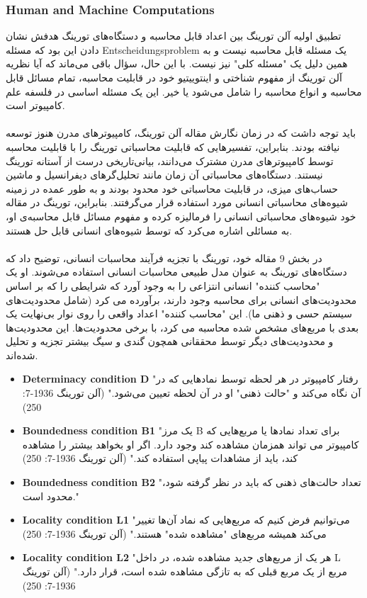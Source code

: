 \documentclass[10pt,a4paper]{article}
\begin{document}
                \subsubsection{Human and Machine Computations}
تطبیق اولیه آلن تورینگ بین اعداد قابل محاسبه و دستگاه‌های تورینگ هدفش نشان دادن این بود که مسئله Entscheidungsproblem یک مسئله قابل محاسبه نیست و به همین دلیل یک "مسئله کلی" نیز نیست. با این حال، سؤال باقی می‌ماند که آیا نظریه آلن تورینگ از مفهوم شناختی و اینتوییتیو خود در قابلیت محاسبه، تمام مسائل قابل محاسبه و انواع محاسبه را شامل می‌شود یا خیر. این یک مسئله اساسی در فلسفه علم کامپیوتر است.
                \\
                \\
باید توجه داشت که در زمان نگارش مقاله آلن تورینگ، کامپیوترهای مدرن هنوز توسعه نیافته بودند. بنابراین، تفسیرهایی که قابلیت محاسباتی تورینگ را با قابلیت محاسبه توسط کامپیوترهای مدرن مشترک می‌دانند، بیانی‌تاریخی درست از آستانه تورینگ نیستند. دستگاه‌های محاسباتی آن زمان مانند تحلیل‌گرهای دیفرانسیل و ماشین حساب‌های میزی، در قابلیت محاسباتی خود محدود بودند و به طور عمده در زمینه شیوه‌های محاسباتی انسانی مورد استفاده قرار می‌گرفتند. بنابراین، تورینگ در مقاله خود شیوه‌های محاسباتی انسانی را فرمالیزه کرده و مفهوم مسائل قابل محاسبه‌ی او، به مسائلی اشاره می‌کرد که توسط شیوه‌های انسانی قابل حل هستند.
                \\
                \\
در بخش 9 مقاله خود، تورینگ با تجزیه فرآیند محاسبات انسانی، توضیح داد که دستگاه‌های تورینگ به عنوان مدل طبیعی محاسبات انسانی استفاده می‌شوند. او یک "محاسب کننده" انسانی انتزاعی را به وجود آورد که شرایطی را که بر اساس محدودیت‌های انسانی برای محاسبه وجود دارند، برآورده می کرد (شامل محدودیت‌های سیستم حسی و ذهنی ما). این "محاسب کننده" اعداد واقعی را روی نوار بی‌نهایت یک بعدی با مربع‌های مشخص شده محاسبه می کرد، با برخی محدودیت‌ها. این محدودیت‌ها و محدودیت‌های دیگر توسط محققانی همچون گندی و سیگ بیشتر تجزیه و تحلیل شده‌اند.
                \begin{itemize}
                    \item \textbf{Determinacy condition D} "رفتار کامپیوتر در هر لحظه توسط نمادهایی که در آن نگاه می‌کند و "حالت ذهنی" او در آن لحظه تعیین می‌شود." (آلن تورینگ 1936-7: 250)
                    \item \textbf{Boundedness condition B1} "یک مرز B برای تعداد نمادها یا مربع‌هایی که کامپیوتر می تواند همزمان مشاهده کند وجود دارد. اگر او بخواهد بیشتر را مشاهده کند، باید از مشاهدات پیاپی استفاده کند." (آلن تورینگ 1936-7: 250)
                    \item \textbf{Boundedness condition B2} "تعداد حالت‌های ذهنی که باید در نظر گرفته شود، محدود است."
                    \item \textbf{Locality condition L1} "می‌توانیم فرض کنیم که مربع‌هایی که نماد آن‌ها تغییر می‌کند همیشه مربع‌های "مشاهده شده" هستند." (آلن تورینگ 1936-7: 250)
                    \item \textbf{Locality condition L2} "هر یک از مربع‌های جدید مشاهده شده، در داخل L مربع از یک مربع قبلی که به تازگی مشاهده شده است، قرار دارد." (آلن تورینگ 1936-7: 250)
                \end{itemize}
\end{document}
